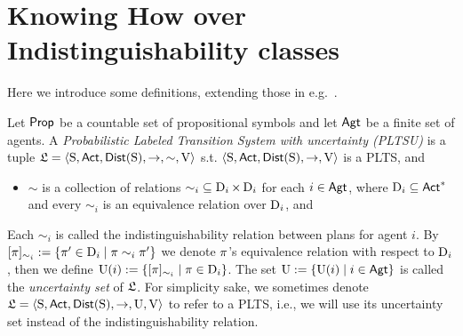 \section{Knowing How over Indistinguishability classes}
\label{sec:kh:indistinguishability}

Here we introduce some definitions, extending those in e.g.~\cite{AFSVQ21,AFSVQ23}.


\begin{definition}\label{def:plts}
    Let ${\rm \sf Prop}$ be a countable set of propositional symbols and let ${\rm \sf Agt}$ be a finite set of agents.  
    A \emph{Probabilistic Labeled Transition System with uncertainty (PLTSU)}  is a tuple
    $\mathfrak{L}=\langle{\operatorname{S},{\rm \sf Act},\mathsf{Dist}(\operatorname{S}),\rightarrow,\sim,\operatorname{V}}\rangle$ s.t. $\langle{\operatorname{S},{\rm \sf Act},\mathsf{Dist}(\operatorname{S}),\rightarrow,\operatorname{V}}\rangle$ is a PLTS, and 
    \begin{itemize}
        \item ${\sim}$ is a collection of relations ${\sim_i}\subseteq \operatorname{D}_{i}\times \operatorname{D}_{i}$ for each $i\in{\rm \sf Agt}$, where $\operatorname{D}_{i}\subseteq{\rm \sf Act}^*$ and every $\sim_i$ is an equivalence relation over $\operatorname{D}_{i}$, and 
    \end{itemize}
    Each $\sim_i$ is called the indistinguishability relation between plans for agent $i$. 
    By $[\pi]_{\sim_i}:=\{{\pi' \in \operatorname{D}_{i} \mid \pi \sim_i \pi'}\}$ we denote $\pi$'s equivalence relation with respect to $\operatorname{D}_{i}$, then we define $\operatorname{U}(i) := \{{[\pi]_{\sim_i} \mid \pi\in\operatorname{D}_{i}}\}$. The set $\operatorname{U}:=\{{\operatorname{U}(i) \mid i\in{\rm \sf Agt}}\}$ is called the \emph{uncertainty set} of $\mathfrak{L}$. For simplicity sake, we sometimes denote $\mathfrak{L}=\langle{\operatorname{S},{\rm \sf Act},\mathsf{Dist}(\operatorname{S}),\rightarrow,\operatorname{U},\operatorname{V}}\rangle$ to refer to a PLTS, i.e., we will use its uncertainty set instead of the indistinguishability relation.
\end{definition}

